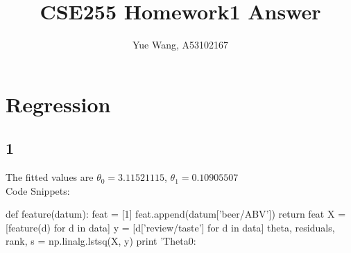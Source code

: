 \documentclass [11pt, a4paper, oneside] {article}
\author {Yue Wang, A53102167}
\title {CSE255 Homework1 Answer}
\begin{document}
\maketitle
\section *{Regression}
\subsection *{1}
The fitted values are $\theta_0 = 3.11521115$, $\theta_1 = 0.10905507$ \\
Code Snippets:
\begin{python} 
def feature(datum):
  feat = [1]
  feat.append(datum['beer/ABV'])
  return feat
X = [feature(d) for d in data]
y = [d['review/taste'] for d in data]
theta, residuals, rank, s = np.linalg.lstsq(X, y)
print 'Theta0:%
\end{python} 
\end{document}
